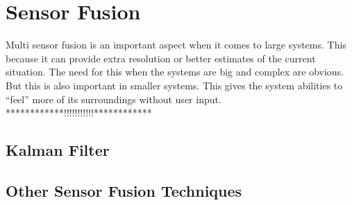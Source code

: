 \chapter{Sensor Fusion}
Multi sensor fusion is an important aspect when it comes to large systems. This because it
can provide extra resolution or better estimates of the current situation. The need for
this when the systems are big and complex are obvious. But this is also important in
smaller systems. This gives the system abilities to ``feel'' more of its surroundings
without user input. ************!!!!!!!!!!!************


\section{Kalman Filter}


\section{Other Sensor Fusion Techniques}



